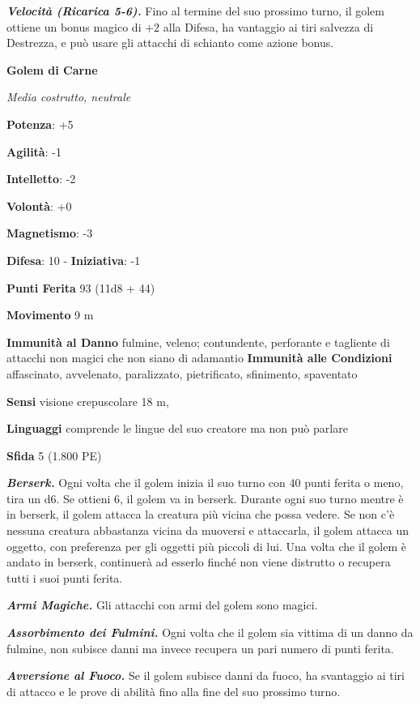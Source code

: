 \begin{multicols}{2}
\emph{\textbf{Velocità (Ricarica 5-6).}} Fino al termine del suo
prossimo turno, il golem ottiene un bonus magico di +2 alla Difesa, ha
vantaggio ai tiri salvezza di Destrezza, e può usare gli attacchi di
schianto come azione bonus.

\textbf{Golem di Carne}

\emph{Media costrutto, neutrale}

\textbf{Potenza}: +5

\textbf{Agilità}: -1

\textbf{Intelletto}: -2

\textbf{Volontà}: +0

\textbf{Magnetismo}: -3

\textbf{Difesa}: 10 - \textbf{Iniziativa}: -1

\textbf{Punti Ferita} 93 (11d8 + 44)

\textbf{Movimento} 9 m

\textbf{Immunità al Danno} fulmine, veleno; contundente, perforante e
tagliente di attacchi non magici che non siano di adamantio
\textbf{Immunità alle Condizioni} affascinato, avvelenato, paralizzato,
pietrificato, sfinimento, spaventato

\textbf{Sensi} visione crepuscolare 18 m, 

\textbf{Linguaggi} comprende le lingue del suo creatore ma non può
parlare

\textbf{Sfida} 5 (1.800 PE)

\emph{\textbf{Berserk.}} Ogni volta che il golem inizia il suo turno con
40 punti ferita o meno, tira un d6. Se ottieni 6, il golem va in
berserk. Durante ogni suo turno mentre è in berserk, il golem attacca la
creatura più vicina che possa vedere. Se non c'è nessuna creatura
abbastanza vicina da muoversi e attaccarla, il golem attacca un oggetto,
con preferenza per gli oggetti più piccoli di lui. Una volta che il
golem è andato in berserk, continuerà ad esserlo finché non viene
distrutto o recupera tutti i suoi punti ferita.

\emph{\textbf{Armi Magiche.}} Gli attacchi con armi del golem sono
magici.

\emph{\textbf{Assorbimento dei Fulmini.}} Ogni volta che il golem sia
vittima di un danno da fulmine, non subisce danni ma invece recupera un
pari numero di punti ferita.

\emph{\textbf{Avversione al Fuoco.}} Se il golem subisce danni da fuoco,
ha svantaggio ai tiri di attacco e le prove di abilità fino alla fine
del suo prossimo turno.


\end{multicols}
